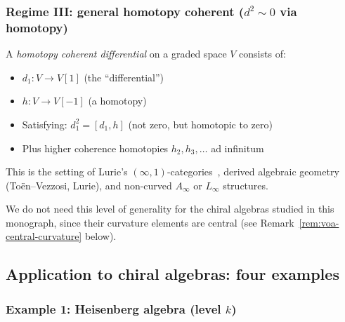 \subsubsection{\texorpdfstring{Regime III: general homotopy coherent ($d^2 \sim 0$ via homotopy)}{Regime III: general homotopy coherent (d2 0 via homotopy)}}

\begin{definition}\label{def:homotopy-coherent}
A \emph{homotopy coherent differential} on a graded space $V$ consists of:
\begin{itemize}
\item $d_1: V \to V[1]$ (the ``differential'')
\item $h: V \to V[-1]$ (a homotopy)
\item Satisfying: $d_1^2 = [d_1, h]$ (not zero, but homotopic to zero)
\item Plus higher coherence homotopies $h_2, h_3, \ldots$ ad infinitum
\end{itemize}
\end{definition}

This is the setting of Lurie's $(\infty, 1)$-categories~\cite{LurieHTT}, derived algebraic geometry (To\"en--Vezzosi, Lurie), and non-curved $A_\infty$ or $L_\infty$ structures.

We do not need this level of generality for the chiral algebras studied in this monograph, since their curvature elements are central (see Remark~\ref{rem:voa-central-curvature} below).

\subsection{Application to chiral algebras: four examples}

\subsubsection{\texorpdfstring{Example 1: Heisenberg algebra (level $k$)}{Example 1: Heisenberg algebra (level k)}}

